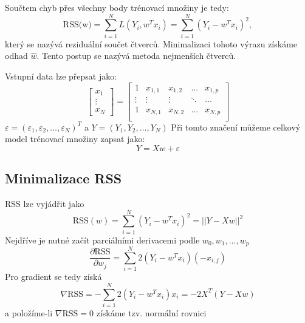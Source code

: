 \documentclass[12pt]{article}
\begin{document}
Součtem chyb přes všechny body trénovací množiny je tedy:
\begin{equation}
\text{RSS(w)}=\sum_{i=1}^NL(Y_i, w^Tx_i)=\sum_{i=1}^N(Y_i-w^Tx_i)^2,
\end{equation}
který se nazývá reziduální součet čtverců. Minimalizaci tohoto výrazu získáme odhad $\hat{w}$. Tento postup se nazývá metoda nejmenších čtverců.

Vstupní data lze přepsat jako:
\begin{equation}
 \begin{bmatrix} 
 	x_1 \\ \vdots \\ x_N 
 \end{bmatrix}
  	=
 \begin{bmatrix}
   1 & x_{1,1} & x_{1,2} & \ldots & x_{1,p}\\
   \vdots & \vdots & \vdots & \ddots & \ldots\\
      1 & x_{N,1} & x_{N,2} & \ldots & x_{N,p}\\
 \end{bmatrix}
\end{equation}
$\varepsilon = (\varepsilon_1, \varepsilon_2, \dots, \varepsilon_N)^T$ a $Y=(Y_1, Y_2, \ldots, Y_N)$ Při tomto značení můžeme celkový model trénovací množiny zapsat jako:
\begin{equation}
Y=Xw+\varepsilon
\end{equation}

\subsection{Minimalizace RSS}
RSS lze vyjádřit jako
\begin{equation}
\text{RSS}(w)=\sum_{i=1}^N(Y_i-w^Tx_i)^2=||Y-Xw||^2
\end{equation}
Nejdříve je nutné začít parciálními derivacemi podle $w_0, w_1, \ldots, w_p$
\begin{equation}
\frac{\partial \text{RSS}}{\partial w_j} = \sum_{i=1}^N2(Y_i-w^Tx_i)(-x_{i,j})
\end{equation}
Pro gradient se tedy získá
\begin{equation}
\nabla \text{RSS} = -\sum_{i=1}^N2(Y_i-w^Tx_i)x_i=-2X^T(Y-Xw)
\end{equation}
a položíme-li $\nabla \text{RSS}=0$ získáme tzv. normální rovnici
\end{document}
